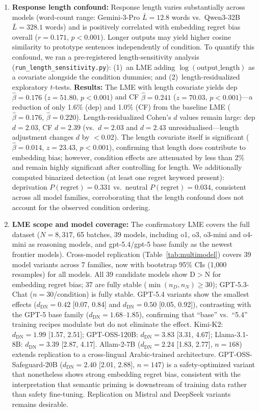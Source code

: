 \documentclass[conference,10pt]{IEEEtran}
\begin{document}
\begin{enumerate}
  \item \textbf{Response length confound:} Response length varies substantially across models (word-count range: Gemini-3-Pro $\bar{L}=12.8$ words vs.\ Qwen3-32B $\bar{L}=328.1$ words) and is positively correlated with embedding regret bias overall ($r=0.171$, $p<0.001$). Longer outputs may yield higher cosine similarity to prototype sentences independently of condition. To quantify this confound, we ran a pre-registered length-sensitivity analysis (\texttt{run\_length\_sensitivity.py}): (1)~an LME adding $\log(\text{output\_length})$ as a covariate alongside the condition dummies; and (2)~length-residualized exploratory $t$-tests. \textbf{Results:} The LME with length covariate yields dep $\hat{\beta}=0.176$ ($z=51.80$, $p<0.001$) and CF $\hat{\beta}=0.241$ ($z=70.03$, $p<0.001$)---a reduction of only 1.6\% (dep) and 1.0\% (CF) from the baseline LME ($\hat{\beta}=0.176$, $\hat{\beta}=0.220$). Length-residualized Cohen's $d$ values remain large: dep $d=2.03$, CF $d=2.39$ (vs.\ $d=2.03$ and $d=2.43$ unresidualised---length adjustment changes $d$ by $<$0.02). The length covariate itself is significant ($\hat{\beta}=0.014$, $z=23.43$, $p<0.001$), confirming that length does contribute to embedding bias; however, condition effects are attenuated by less than 2\% and remain highly significant after controlling for length. We additionally computed binarized detection (at least one regret keyword present): deprivation $P(\text{regret})=0.331$ vs.\ neutral $P(\text{regret})=0.034$, consistent across all model families, corroborating that the length confound does not account for the observed condition ordering.
  \item \textbf{LME scope and model coverage:} The confirmatory LME covers the full dataset ($N=8{,}317$, 65 batches, 39 models, including o1, o3, o3-mini and o4-mini as reasoning models, and gpt-5.4/gpt-5 base family as the newest frontier models). Cross-model replication (Table~\ref{tab:multimodel}) covers 39 model variants across 7 families, now with bootstrap 95\% CIs (1{,}000 resamples) for all models. All 39 candidate models show D$>$N for embedding regret bias; 37 are fully stable ($\min(n_D,n_N)\geq30$); GPT-5.3-Chat ($n=30$/condition) is fully stable. GPT-5.4 variants show the smallest effects ($d_\text{DN}=0.42$ [0.07, 0.84] and $d_\text{DN}=0.50$ [0.05, 0.92]), contrasting with the GPT-5 base family ($d_\text{DN}=1.68$--$1.85$), confirming that ``base'' vs.\ ``5.4'' training recipes modulate but do not eliminate the effect. Kimi-K2: $d_\text{DN}=1.99$ [1.57, 2.51]; GPT-OSS-120B: $d_\text{DN}=3.83$ [3.31, 4.67]; Llama-3.1-8B: $d_\text{DN}=3.39$ [2.87, 4.17]. Allam-2-7B ($d_\text{DN}=2.24$ [1.83, 2.77], $n=168$) extends replication to a cross-lingual Arabic-trained architecture. GPT-OSS-Safeguard-20B ($d_\text{DN}=2.40$ [2.01, 2.88], $n=147$) is a safety-optimized variant that nonetheless shows strong embedding regret bias, consistent with the interpretation that semantic priming is downstream of training data rather than safety fine-tuning. Replication on Mistral and DeepSeek variants remains desirable.


\end{enumerate}
\end{document}
